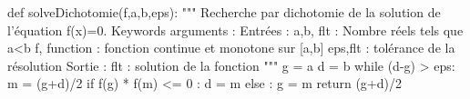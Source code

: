 \documentclass[10pt]{article}
\begin{document}
\begin{minipage}[c]{.48\linewidth}
\begin{pseudo}
\end{pseudo}
%
\end{minipage} \hfill
\begin{minipage}[c]{.48\linewidth}
\begin{py}
\begin{python}
def solveDichotomie(f,a,b,eps):
    """
    Recherche par dichotomie de la solution 
    de l'équation f(x)=0.
    Keywords arguments :
    Entrées : 
        a,b, flt : Nombre réels tels que a<b
        f, function : fonction continue et monotone 
        sur [a,b]
        eps,flt : tolérance de la résolution
    Sortie : 
        flt : solution de la fonction
    """
    g = a
    d = b
    while (d-g) > eps:
        m = (g+d)/2 
        if f(g) * f(m) <= 0 :
            d = m
        else :
            g  = m
    return (g+d)/2
\end{python}
\end{py}
\end{minipage}

\end{document}
